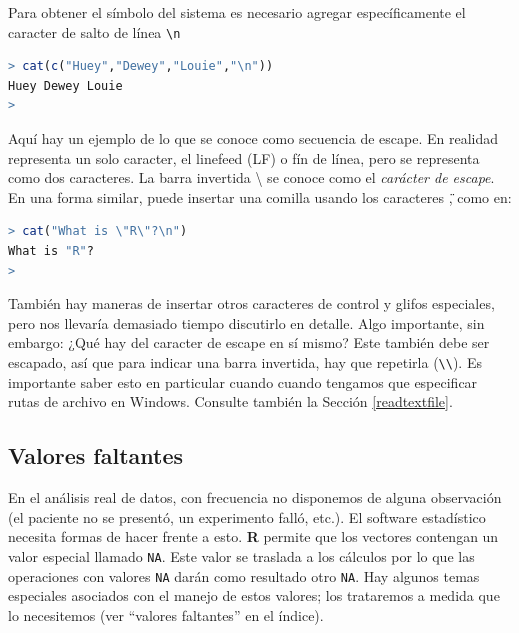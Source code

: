 \documentclass[spanish]{extbook}
\numberwithin{equation}{section}
\numberwithin{figure}{section}
\begin{document}
Para obtener el símbolo del sistema es necesario agregar específicamente el
caracter de salto de línea \texttt{\textbackslash{}n}

\begin{lstlisting}[language=R]
> cat(c("Huey","Dewey","Louie","\n"))
Huey Dewey Louie
>
\end{lstlisting}

Aquí hay un ejemplo de lo que se conoce como secuencia de escape. En realidad
representa un solo caracter, el linefeed (LF) o fín de línea, pero se
representa como dos caracteres. La barra invertida \textbackslash{} se conoce
como el \textit{carácter de escape}. En una forma similar, puede insertar una
comilla usando los caracteres \texttt{\"}, como en:

\begin{lstlisting}[language=R]
> cat("What is \"R\"?\n")
What is "R"?
> 
\end{lstlisting}

También hay maneras de insertar otros caracteres de control y glifos
especiales, pero nos llevaría demasiado tiempo discutirlo en detalle. Algo
importante, sin embargo: ¿Qué hay del caracter de escape en sí mismo?  Este
también debe ser escapado, así que para indicar una barra invertida, hay que
repetirla (\texttt{\textbackslash{}\textbackslash{}}). Es importante saber esto
en particular cuando cuando tengamos que especificar rutas de archivo en
Windows. Consulte también la Sección \ref{readtextfile}.

\subsection{Valores faltantes} \label{na}

En el análisis real de datos, con frecuencia no disponemos de alguna
observación (el paciente no se presentó, un experimento falló, etc.). El
software estadístico necesita formas de hacer frente a esto. \textbf{R} permite
que los vectores contengan un valor especial llamado \texttt{NA}. Este valor se
traslada a los cálculos por lo que las operaciones con valores \texttt{NA}
darán como resultado otro \texttt{NA}. Hay algunos temas especiales asociados
con el manejo de estos valores; los trataremos a medida que lo necesitemos (ver
``valores faltantes'' en el índice).

\end{document}
